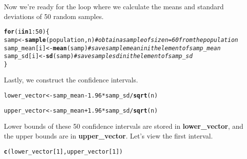 \documentclass{article}\usepackage[]{graphicx}\usepackage[]{color}
\makeatletter
\newcommand{\hlnum}[1]{\textcolor[rgb]{0.686,0.059,0.569}{#1}}%
\newcommand{\hlcom}[1]{\textcolor[rgb]{0.678,0.584,0.686}{\textit{#1}}}%
\newcommand{\hlopt}[1]{\textcolor[rgb]{0,0,0}{#1}}%
\newcommand{\hlstd}[1]{\textcolor[rgb]{0.345,0.345,0.345}{#1}}%
\newcommand{\hlkwa}[1]{\textcolor[rgb]{0.161,0.373,0.58}{\textbf{#1}}}%
\newcommand{\hlkwb}[1]{\textcolor[rgb]{0.69,0.353,0.396}{#1}}%
\newcommand{\hlkwd}[1]{\textcolor[rgb]{0.737,0.353,0.396}{\textbf{#1}}}%
\newenvironment{kframe}{%
 \def\at@end@of@kframe{}%
 \ifinner\ifhmode%
  \def\at@end@of@kframe{\end{minipage}}%
  \begin{minipage}{\columnwidth}%
 \fi\fi%
 \def\FrameCommand##1{\hskip\@totalleftmargin \hskip-\fboxsep
 \colorbox{shadecolor}{##1}\hskip-\fboxsep
     \hskip-\linewidth \hskip-\@totalleftmargin \hskip\columnwidth}%
 \MakeFramed {\advance\hsize-\width
   \@totalleftmargin\z@ \linewidth\hsize
   \@setminipage}}%
 {\par\unskip\endMakeFramed%
 \at@end@of@kframe}
\newenvironment{knitrout}{}{} %
\makeatother
\begin{document}
Now we're ready for the loop where we calculate the means and standard deviations of 50 random samples.

\begin{knitrout}
\color{fgcolor}\begin{kframe}
\begin{alltt}
\hlkwa{for}\hlstd{(i} \hlkwa{in} \hlnum{1}\hlopt{:}\hlnum{50}\hlstd{)\{}
  \hlstd{samp} \hlkwb{<-} \hlkwd{sample}\hlstd{(population, n)} \hlcom{# obtain a sample of size n = 60 from the population}
  \hlstd{samp_mean[i]} \hlkwb{<-} \hlkwd{mean}\hlstd{(samp)}    \hlcom{# save sample mean in ith element of samp_mean}
  \hlstd{samp_sd[i]} \hlkwb{<-} \hlkwd{sd}\hlstd{(samp)}        \hlcom{# save sample sd in ith element of samp_sd}
\hlstd{\}}
\end{alltt}
\end{kframe}
\end{knitrout}


Lastly, we construct the confidence intervals.

\begin{knitrout}
\color{fgcolor}\begin{kframe}
\begin{alltt}
\hlstd{lower_vector} \hlkwb{<-} \hlstd{samp_mean} \hlopt{-} \hlnum{1.96} \hlopt{*} \hlstd{samp_sd}\hlopt{/}\hlkwd{sqrt}\hlstd{(n)}

\hlstd{upper_vector} \hlkwb{<-} \hlstd{samp_mean} \hlopt{+} \hlnum{1.96} \hlopt{*} \hlstd{samp_sd}\hlopt{/}\hlkwd{sqrt}\hlstd{(n)}
\end{alltt}
\end{kframe}
\end{knitrout}


Lower bounds of these 50 confidence intervals are stored in \hlkwd{lower\_vector}, and the upper bounds are in \hlkwd{upper\_vector}. Let's view the first interval.

\begin{knitrout}
\color{fgcolor}\begin{kframe}
\begin{alltt}
\hlkwd{c}\hlstd{(lower_vector[}\hlnum{1}\hlstd{], upper_vector[}\hlnum{1}\hlstd{])}
\end{alltt}
\end{kframe}
\end{knitrout}


\vspace{1.5cm}
\end{document}
